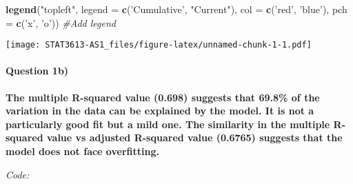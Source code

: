\documentclass[]{article}
\newenvironment{Shaded}{\begin{snugshade}}{\end{snugshade}}
\newcommand{\CommentTok}[1]{\textcolor[rgb]{0.56,0.35,0.01}{\textit{#1}}}
\newcommand{\DataTypeTok}[1]{\textcolor[rgb]{0.13,0.29,0.53}{#1}}
\newcommand{\DecValTok}[1]{\textcolor[rgb]{0.00,0.00,0.81}{#1}}
\newcommand{\KeywordTok}[1]{\textcolor[rgb]{0.13,0.29,0.53}{\textbf{#1}}}
\newcommand{\NormalTok}[1]{#1}
\newcommand{\OperatorTok}[1]{\textcolor[rgb]{0.81,0.36,0.00}{\textbf{#1}}}
\newcommand{\OtherTok}[1]{\textcolor[rgb]{0.56,0.35,0.01}{#1}}
\newcommand{\StringTok}[1]{\textcolor[rgb]{0.31,0.60,0.02}{#1}}
\let\oldparagraph\paragraph
\renewcommand{\paragraph}[1]{\oldparagraph{#1}\mbox{}}
\begin{document}
\begin{Shaded}
\begin{Highlighting}[]
\KeywordTok{legend}\NormalTok{(}\StringTok{"topleft"}\NormalTok{, }\DataTypeTok{legend =} \KeywordTok{c}\NormalTok{(}\StringTok{'Cumulative'}\NormalTok{, }\StringTok{"Current"}\NormalTok{), }\DataTypeTok{col =} \KeywordTok{c}\NormalTok{(}\StringTok{'red'}\NormalTok{, }\StringTok{'blue'}\NormalTok{), }\DataTypeTok{pch =} \KeywordTok{c}\NormalTok{(}\StringTok{'x'}\NormalTok{, }\StringTok{'o'}\NormalTok{)) }\CommentTok{#Add legend}
\end{Highlighting}
\end{Shaded}

\texttt{[image: STAT3613-AS1\_files/figure-latex/unnamed-chunk-1-1.pdf]}

\hypertarget{question-1b}{%
\paragraph{Question 1b)}\label{question-1b}}

\textbf{The multiple R-squared value (0.698) suggests that 69.8\% of the
variation in the data can be explained by the model. It is not a
particularly good fit but a mild one. The similarity in the multiple
R-squared value vs adjusted R-squared value (0.6765) suggests that the
model does not face overfitting.}

\emph{Code:}

\begin{Shaded}
\end{Shaded}
\end{document}
